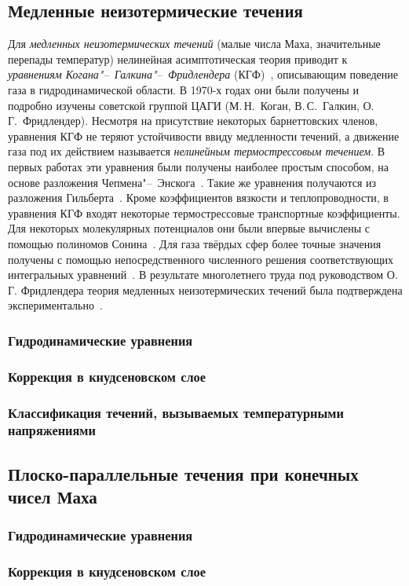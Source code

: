 \subsection{Медленные неизотермические течения}

Для \emph{медленных неизотермических течений} (малые числа Маха, значительные перепады температур)
нелинейная асимптотическая теория приводит к \emph{уравнениям Когана"--~Галкина"--~Фридлендера} (КГФ)~\cite{Kogan1976},
описывающим поведение газа в гидродинамической области.
В 1970-х годах они были получены и подробно изучены советской группой ЦАГИ
(М.\,Н.~Коган, В.\,С.~Галкин, О.\,Г.~Фридлендер).
Несмотря на присутствие некоторых барнеттовских членов,
уравнения КГФ не теряют устойчивости ввиду медленности течений,
а движение газа под их действием называется \emph{нелинейным термострессовым течением}.
В первых работах эти уравнения были получены наиболее простым способом,
на основе разложения Чепмена"--~Энскога~\cite{Kogan1970, Kogan1971}.
Такие же уравнения получаются из разложения Гильберта~\cite{Galkin1974}.
Кроме коэффициентов вязкости и теплопроводности, в уравнения КГФ входят некоторые
термострессовые транспортные коэффициенты. Для некоторых молекулярных потенциалов они
были впервые вычислены с помощью полиномов Сонина~\cite{Burnett1935, Chapman1960}.
Для газа твёрдых сфер более точные значения получены с помощью
непосредственного численного решения соответствующих интегральных уравнений~\cite{Sone1996}.
В результате многолетнего труда под руководством О.\,Г. Фридлендера теория медленных неизотермических течений
была подтверждена экспериментально~\cite{Friedlander1997, Friedlander2003}.

\subsubsection{Гидродинамические уравнения}
\subsubsection{Коррекция в кнудсеновском слое}
\subsubsection{Классификация течений, вызываемых температурными напряжениями}

\subsection{Плоско-параллельные течения при конечных чисел Маха}

\subsubsection{Гидродинамические уравнения}
\subsubsection{Коррекция в кнудсеновском слое}

\clearpage
